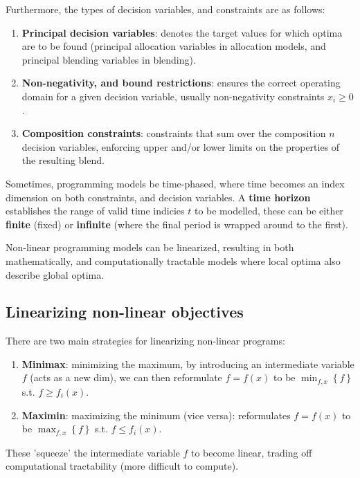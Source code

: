 \documentclass{article}
\begin{document}
Furthermore, the types of decision variables, and constraints are as follows:
\begin{enumerate}
    \item \textbf{Principal decision variables}: denotes the target values for which optima are to be found (principal allocation variables in allocation models, and principal blending variables in blending).
    \item \textbf{Non-negativity, and bound restrictions}: ensures the correct operating domain for a given decision variable, usually non-negativity constraints \(x_i \geq 0\).
    \item \textbf{Composition constraints}: constraints that sum over the composition \(n\) decision variables, enforcing upper and/or lower limits on the properties of the resulting blend.
\end{enumerate}

Sometimes, programming models be time-phased, where time becomes an index dimension on both constraints, and decision variables. A \textbf{time horizon} establishes the range of valid time indicies \(t\) to be modelled, these can be either \textbf{finite} (fixed) or \textbf{infinite} (where the final period is wrapped around to the first).

Non-linear programming models can be linearized, resulting in both mathematically, and computationally tractable models where local optima also describe global optima.

\subsection{Linearizing non-linear objectives}

There are two main strategies for linearizing non-linear programs:
\begin{enumerate}
    \item \textbf{Minimax}: minimizing the maximum, by introducing an intermediate variable \(f\) (acts as a new dim), we can then reformulate \(f = f\left(x\right)\) to be \(\min_{f,x} \left\{ f \right\}\) s.t. \(f \geq f_i\left(x\right)\).
    \item \textbf{Maximin}: maximizing the minimum (vice versa): reformulates \(f = f\left(x\right)\) to be \(\max_{f,x} \left\{ f \right\}\) s.t. \(f \leq f_i\left(x\right)\).
\end{enumerate}

These 'squeeze' the intermediate variable \(f\) to become linear, trading off computational tractability (more difficult to compute).
\end{document}
